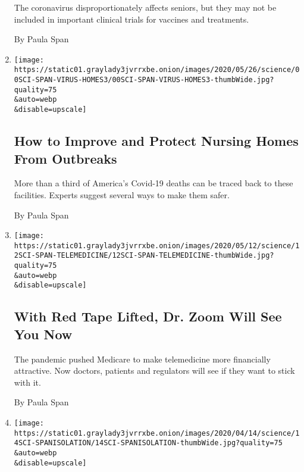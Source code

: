 \begin{enumerate}
  The coronavirus disproportionately affects seniors, but they may not
  be included in important clinical trials for vaccines and treatments.

  By Paula Span
\item
  \href{/2020/05/22/health/coronavirus-nursing-homes.html}{}

  \texttt{[image: https://static01.graylady3jvrrxbe.onion/images/2020/05/26/science/00SCI-SPAN-VIRUS-HOMES3/00SCI-SPAN-VIRUS-HOMES3-thumbWide.jpg?quality=75\\\&auto=webp\\\&disable=upscale]}

  \hypertarget{how-to-improve-and-protect-nursing-homes-from-outbreaks}{%
  \subsection{How to Improve and Protect Nursing Homes From
  Outbreaks}\label{how-to-improve-and-protect-nursing-homes-from-outbreaks}}

  More than a third of America's Covid-19 deaths can be traced back to
  these facilities. Experts suggest several ways to make them safer.

  By Paula Span
\item
  \href{/2020/05/08/health/coronavirus-telemedicine-seniors.html}{}

  \texttt{[image: https://static01.graylady3jvrrxbe.onion/images/2020/05/12/science/12SCI-SPAN-TELEMEDICINE/12SCI-SPAN-TELEMEDICINE-thumbWide.jpg?quality=75\\\&auto=webp\\\&disable=upscale]}

  \hypertarget{with-red-tape-lifted-dr-zoom-will-see-you-now}{%
  \subsection{With Red Tape Lifted, Dr. Zoom Will See You
  Now}\label{with-red-tape-lifted-dr-zoom-will-see-you-now}}

  The pandemic pushed Medicare to make telemedicine more financially
  attractive. Now doctors, patients and regulators will see if they want
  to stick with it.

  By Paula Span
\item
  \href{/2020/04/13/health/coronavirus-elderly-isolation-loneliness.html}{}

  \texttt{[image: https://static01.graylady3jvrrxbe.onion/images/2020/04/14/science/14SCI-SPANISOLATION/14SCI-SPANISOLATION-thumbWide.jpg?quality=75\\\&auto=webp\\\&disable=upscale]}

  \hypertarget{just-what-older-people-didnt-need-more-isolation}{%
}
\end{enumerate}
